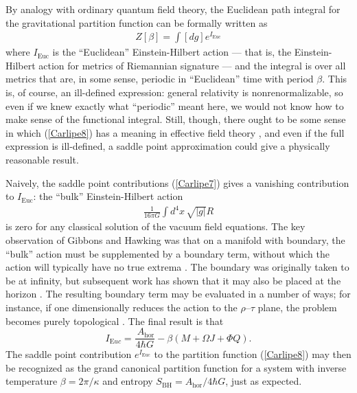 \documentclass[11pt]{article}
\begin{document}
By analogy with ordinary quantum field theory,
the Euclidean path integral for the gravitational partition function can 
be formally written as
\begin{align}
Z[\beta] = \int [dg] e^{I_{\scriptscriptstyle\mathrm{Euc}}}
\label{Carlipe8}
\end{align}
where $I_{\scriptscriptstyle\mathrm{Euc}}$ is the ``Euclidean'' 
Einstein-Hilbert action --- that is, the Einstein-Hilbert action for
metrics of Riemannian signature --- and the integral is over all
metrics that are, in some sense, periodic in ``Euclidean'' 
time with period $\beta$.  This is, of course, an ill-defined expression: 
general relativity is nonrenormalizable, so even if we knew exactly what 
``periodic'' meant here, we would not know how to make sense of the 
functional integral.  
Still, though, there ought to be some sense in which (\ref{Carlipe8})  
has a meaning in effective field theory \cite{Burgess}, and even if the
full expression is ill-defined, a saddle point approximation could
give a physically reasonable result. 

Naively, the saddle point contributions (\ref{Carlipe7}) 
gives a vanishing contribution to
$I_{\scriptscriptstyle\mathrm{Euc}}$: the ``bulk'' Einstein-Hilbert action
\begin{align*}
\frac{1}{16\pi G}\int d^4x\,\sqrt{|g|}R
\end{align*}
is zero for any classical solution of the vacuum field equations.  The  
key observation of Gibbons and Hawking \cite{GibHawk} was that on
a manifold with boundary, the ``bulk'' action must be supplemented 
by a boundary term, without which the action will  typically have no true
extrema \cite{Regge}.   The boundary was originally taken to be
at infinity, but subsequent work has shown that it may also be
placed at the horizon \cite{BTZa,Teitelboim,HawkingHorowitz}.  
The resulting boundary term may be evaluated in a number of ways;
for instance, if one dimensionally reduces the action to the 
$\rho$--$\tau$ plane, the problem becomes purely topological 
\cite{BTZa}.  The final result is that
\begin{equation}
I_{\scriptscriptstyle\mathrm Euc} 
 = \frac{\ A_{\mathrm{\scriptstyle hor}}}{4\hbar G}
 - \beta(M + \Omega J + \Phi Q) .
\label{Carlipe9}
\end{equation}
The saddle point contribution $e^{I_{\scriptscriptstyle\mathrm{Euc}}}$ 
to the partition function (\ref{Carlipe8}) may then be recognized as the 
grand canonical partition function for a system with inverse temperature 
$\beta = 2\pi/\kappa$ and entropy $S_{\scriptscriptstyle\mathrm{BH}}%
=  A_{\mathrm{\scriptstyle hor}}/4\hbar G$, just as expected.  
\end{document}
